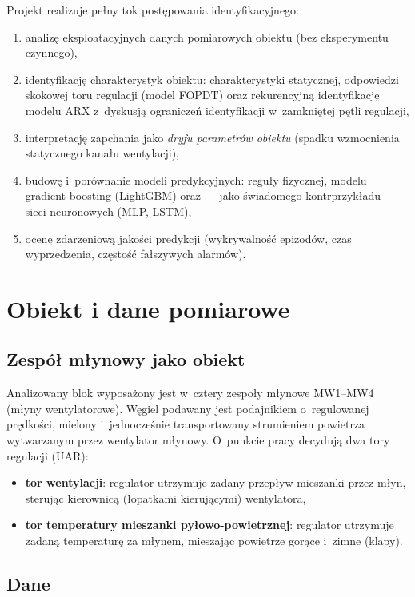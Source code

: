 \documentclass[11pt,a4paper]{article}
\begin{document}
Projekt realizuje pełny tok postępowania identyfikacyjnego:
\begin{enumerate}
  \item analizę eksploatacyjnych danych pomiarowych obiektu (bez eksperymentu czynnego),
  \item identyfikację charakterystyk obiektu: charakterystyki statycznej,
        odpowiedzi skokowej toru regulacji (model FOPDT) oraz rekurencyjną
        identyfikację modelu ARX z~dyskusją ograniczeń identyfikacji
        w~zamkniętej pętli regulacji,
  \item interpretację zapchania jako \emph{dryfu parametrów obiektu}
        (spadku wzmocnienia statycznego kanału wentylacji),
  \item budowę i~porównanie modeli predykcyjnych: reguły fizycznej, modelu
        gradient boosting (LightGBM) oraz --- jako świadomego kontrprzykładu ---
        sieci neuronowych (MLP, LSTM),
  \item ocenę zdarzeniową jakości predykcji (wykrywalność epizodów, czas
        wyprzedzenia, częstość fałszywych alarmów).
\end{enumerate}

\section{Obiekt i dane pomiarowe}

\subsection{Zespół młynowy jako obiekt}

Analizowany blok wyposażony jest w~cztery zespoły młynowe MW1--MW4 (młyny
wentylatorowe). Węgiel podawany jest podajnikiem o~regulowanej prędkości,
mielony i~jednocześnie transportowany strumieniem powietrza wytwarzanym przez
wentylator młynowy. O~punkcie pracy decydują dwa tory regulacji (UAR):
\begin{itemize}
  \item \textbf{tor wentylacji}: regulator utrzymuje zadany przepływ mieszanki
        przez młyn, sterując kierownicą (łopatkami kierującymi) wentylatora,
  \item \textbf{tor temperatury mieszanki pyłowo-powietrznej}: regulator
        utrzymuje zadaną temperaturę za młynem, mieszając powietrze gorące
        i~zimne (klapy).
\end{itemize}

\subsection{Dane}
\end{document}
